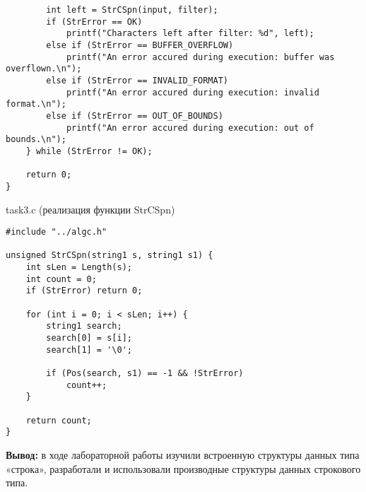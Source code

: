 \documentclass[a4paper,14pt]{extarticle}
\begin{document}
\begin{enumerate}
\begin{verbatim}
        int left = StrCSpn(input, filter);
        if (StrError == OK)
            printf("Characters left after filter: %d", left);
        else if (StrError == BUFFER_OVERFLOW)
            printf("An error accured during execution: buffer was overflown.\n");
        else if (StrError == INVALID_FORMAT)
            printf("An error accured during execution: invalid format.\n");
        else if (StrError == OUT_OF_BOUNDS)
            printf("An error accured during execution: out of bounds.\n");
    } while (StrError != OK);

    return 0;
}
\end{verbatim}
task3.c (реализация функции StrCSpn)
\begin{verbatim}
#include "../algc.h"

unsigned StrCSpn(string1 s, string1 s1) {
    int sLen = Length(s);
    int count = 0;
    if (StrError) return 0;

    for (int i = 0; i < sLen; i++) {
        string1 search;
        search[0] = s[i];
        search[1] = '\0';

        if (Pos(search, s1) == -1 && !StrError)
            count++;
    }

    return count;
}
\end{verbatim}
\end{enumerate}
\textbf{Вывод: } в ходе лабораторной работы изучили встроенную структуры данных типа «строка»,
разработали и использовали производные структуры данных строкового типа.
\end{document}
